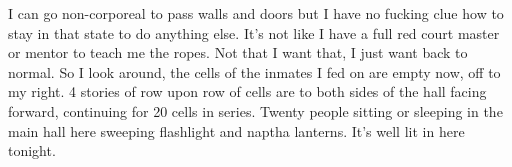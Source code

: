 I can go non-corporeal to pass walls and doors but I have no fucking clue how to stay in that state to do anything else. It's not like I have a full red court master or mentor to teach me the ropes. Not that I want that, I just want back to normal. So I look around, the cells of the inmates I fed on are empty now, off to my right. 4 stories of row upon row of cells are to both sides of the hall facing forward, continuing for 20 cells in series. Twenty people sitting or sleeping in the main hall here sweeping flashlight and naptha lanterns. It's well lit in here tonight.




